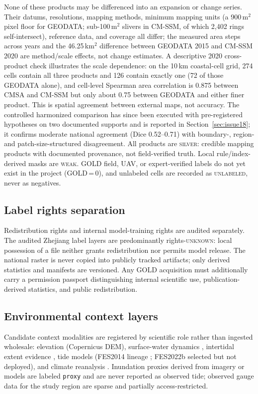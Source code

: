 None of these products may be differenced into an expansion or change
series. Their datums, resolutions, mapping methods, minimum mapping
units (a 900\,m$^2$ pixel floor for GEODATA; sub-100\,m$^2$ slivers in
CM-SSM, of which 2{,}402 rings self-intersect), reference data, and
coverage all differ; the measured area steps across years and the
46.25\,km$^2$ difference between GEODATA 2015 and CM-SSM 2020 are
method/scale effects, not change estimates. A descriptive 2020
cross-product check illustrates the scale dependence: on the 10\,km
coastal-cell grid, 274 cells contain all three products and 126 contain
exactly one (72 of those GEODATA alone), and cell-level Spearman area
correlation is 0.875 between CMSA and CM-SSM but only about 0.75
between GEODATA and either finer product. This is spatial agreement
between external maps, not accuracy. The controlled harmonized
comparison has since been executed with pre-registered hypotheses on
two documented supports and is reported in
Section~\ref{sec:issue18}; it confirms moderate national agreement
(Dice 0.52--0.71) with boundary-, region- and patch-size-structured
disagreement. All products are \textsc{silver}:
credible mapping products with documented provenance, not
field-verified truth. Local rule/index-derived masks are
\textsc{weak}. GOLD field, UAV, or expert-verified labels do not yet
exist in the project (GOLD\,=\,0), and unlabeled cells are recorded as
\textsc{unlabeled}, never as negatives.



\subsection{Label rights separation}
Redistribution rights and internal model-training rights are audited
separately. The audited Zhejiang label layers are predominantly
rights-\textsc{unknown}: local possession of a file neither grants
redistribution nor permits model release. The national raster is never
copied into publicly tracked artifacts; only derived statistics and
manifests are versioned. Any GOLD acquisition must additionally carry a
permission passport distinguishing internal scientific use,
publication-derived statistics, and public redistribution.

\subsection{Environmental context layers}
Candidate context modalities are registered by scientific role rather
than ingested wholesale: elevation (Copernicus DEM), surface-water
dynamics \citep{pekel2016gsw}, intertidal extent evidence
\citep{murray2019tidalflats}, tide models (FES2014 lineage
\citep{lyard2021fes}; FES2022b selected but not deployed), and climate
reanalysis \citep{munoz2021era5land}. Inundation proxies derived from
imagery or models are labeled \texttt{proxy} and are never reported as
observed tide; observed gauge data for the study region are sparse and
partially access-restricted.
